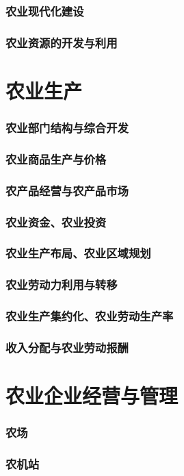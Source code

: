 \documentclass[UTF8]{../../RepresentationUniverse}
\begin{document}
    \subsubsection{农业现代化建设}
    \subsubsection{农业资源的开发与利用}
\section{农业生产}
    \subsubsection{农业部门结构与综合开发}
    \subsubsection{农业商品生产与价格}
    \subsubsection{农产品经营与农产品市场}
    \subsubsection{农业资金、农业投资}
    \subsubsection{农业生产布局、农业区域规划}
    \subsubsection{农业劳动力利用与转移}
    \subsubsection{农业生产集约化、农业劳动生产率}
    \subsubsection{收入分配与农业劳动报酬}
\section{农业企业经营与管理}
    \subsubsection{农场}
    \subsubsection{农机站}
\end{document}
